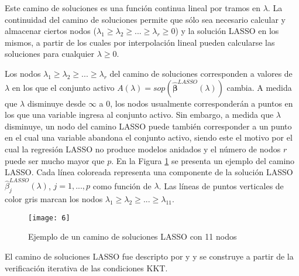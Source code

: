 \documentclass[a4paper,12pt]{report}
\begin{document}
Este camino de soluciones es una función continua lineal por tramos en $\lambda$. La continuidad del camino de soluciones permite que sólo sea necesario calcular y almacenar ciertos nodos ($\lambda_1 \geq \lambda_2 \geq ... \geq \lambda_r \geq 0$) y la solución LASSO en los mismos, a partir de los cuales por interpolación lineal pueden calcularse las soluciones para cualquier $\lambda \geq 0$.

Los nodos $\lambda_1 \geq \lambda_2 \geq ... \geq \lambda_r$ del camino de soluciones corresponden a valores de $\lambda$ en los que el conjunto activo $A(\lambda)=sop\left(\boldsymbol{\hat{\beta}}^{LASSO}(\lambda)\right)$ cambia. A medida que $\lambda$ disminuye desde $\infty$ a $0$, los nodos usualmente corresponderán a puntos en los que una variable ingresa al conjunto activo. Sin embargo, a medida que $\lambda$ disminuye, un nodo del camino LASSO puede también corresponder a un punto en el cual una variable abandona el conjunto activo, siendo este el motivo por el cual la regresión LASSO no produce modelos anidados y el número de nodos $r$ puede ser mucho mayor que $p$. En la Figura \ref{fig: LassoPath} se presenta un ejemplo del camino LASSO. Cada línea coloreada representa una componente de la solución LASSO $\hat{\beta}_j^{LASSO}(\lambda)$, $j=1, ..., p$ como función de $\lambda$. Las líneas de puntos verticales de color gris marcan los nodos $\lambda_1 \geq \lambda_2 \geq ... \geq \lambda_{11}$.

\begin{figure}[H]
	\centering
	\texttt{[image: 6]}
	\caption{Ejemplo de un camino de soluciones LASSO con 11 nodos}
	\label{fig: LassoPath}
	\end{figure}
	
El camino de soluciones LASSO fue descripto por \citet{osborne2000new} y \citet{efron2004least} y se construye a partir de la verificación iterativa de las condiciones KKT. 
\end{document}
